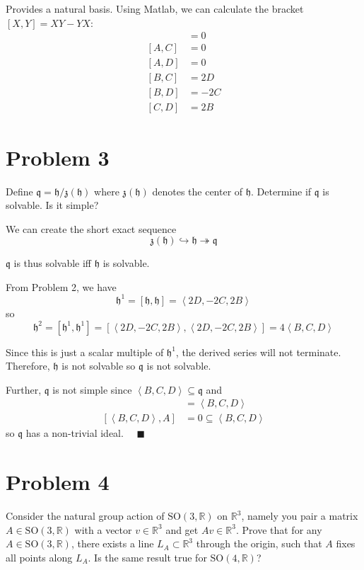 \documentclass[12pt]{article}
\newcommand{\R}{\mathbb{R}}
\newcommand{\SO}{\text{SO}}
\newcommand{\h}{\mathfrak{h}}
\newcommand{\q}{\mathfrak{q}}
\newcommand{\qed}{\quad \blacksquare}
\newcommand{\brak}[1]{\left\langle #1 \right\rangle}
\begin{document}
        Provides a natural basis. Using Matlab, we can calculate the bracket $[X, Y] = XY - YX$: 
        \begin{align*}
            [A, B] &= 0 \\ 
            [A, C] &= 0\\ 
            [A, D] &= 0\\ 
            [B, C] &= 2D\\ 
            [B, D] &= -2C\\ 
            [C, D] &= 2B
        \end{align*}
    \color{black}

\pagebreak

\section*{Problem 3} Define $\mathfrak{q} = \h/\mathfrak{z}(\h)$ where $\mathfrak{z}(\h)$ denotes the center of $\h$.  Determine if $\mathfrak{q}$ is solvable.  Is it simple?

    \color{blue}
        We can create the short exact sequence 
        \[\mathfrak{z}(\h) \hookrightarrow \h \twoheadrightarrow \mathfrak{q}\]

        $\mathfrak{q}$ is thus solvable iff $\h$ is solvable. 

        From Problem 2, we have 
        \[\h^1 = [\h, \h] = \brak{2D, -2C, 2B}\]
        so 
        \[\h^2 = [\h^1, \h^1] = [\brak{2D, -2C, 2B}, \brak{2D, -2C, 2B}] = 4\brak{B, C, D}\]

        Since this is just a scalar multiple of $\h^1$, the derived series will not terminate. Therefore, $\h$ is not solvable so $\mathfrak{q}$ is not solvable.

        Further, $\q$ is not simple since $\brak{B, C, D} \subseteq \q$ and 
        \begin{align*}
            [\brak{B, C, D}, \brak{B, C, D}] &= \brak{B, C, D}\\
            [\brak{B, C, D}, A] &= 0 \subseteq \brak{B, C, D}
        \end{align*} 
        so $\q$ has a non-trivial ideal. $\qed$ 

    \color{black}
\pagebreak

\section*{Problem 4} Consider the natural group action of $\SO(3,\R)$ on $\R^{3}$, namely you pair a matrix $A \in \SO(3,\R)$ with a vector $v \in \R^{3}$ and get $Av \in \R^{3}$.  Prove that for any $A \in \SO(3,\R)$, there exists a line $L_{A} \subset \R^{3}$ through the origin, such that $A$ fixes all points along $L_{A}$.  Is the same result true for $\SO(4,\R)$?
\end{document}
